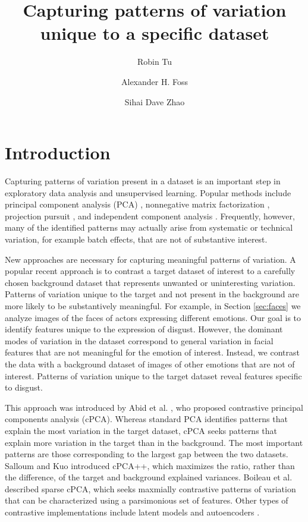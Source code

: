 \documentclass[12pt]{article}
\title{Capturing patterns of variation unique to a specific dataset}
\author[1]{Robin Tu}
\author[2]{ Alexander H. Foss }
\author[1]{Sihai Dave Zhao}
\affil[1]{Department of Statistics, University of Illinois at Urbana-Champaign, Champaign, IL}
\affil[2]{Statistical Sciences, Sandia National Laboratories, Albuquerque, NM}
\begin{document}
\maketitle

\section{Introduction}

Capturing patterns of variation present in a dataset is an important step in exploratory data analysis and unsupervised learning. Popular methods include principal component analysis (PCA) \cite{pca}, nonnegative matrix factorization \cite{Lee1999}, projection pursuit \cite{pp}, and independent component analysis \cite{ica}. Frequently, however, many of the identified patterns may actually arise from systematic or technical variation, for example batch effects, that are not of substantive interest.

New approaches are necessary for capturing meaningful patterns of variation. A popular recent approach is to contrast a target dataset of interest to a carefully chosen background dataset that represents unwanted or uninteresting variation. Patterns of variation unique to the target and not present in the background are more likely to be substantively meaningful. For example, in Section \ref{sec:faces} we analyze images of the faces of actors expressing different emotions. Our goal is to identify features unique to the expression of disgust. However, the dominant modes of variation in the dataset correspond to general variation in facial features that are not meaningful for the emotion of interest. Instead, we contrast the data with a background dataset of images of other emotions that are not of interest. Patterns of variation unique to the target dataset reveal features specific to disgust.

This approach was introduced by Abid et al. \cite{Abid}, who proposed contrastive principal components analysis (cPCA). Whereas standard PCA identifies patterns that explain the most variation in the target dataset, cPCA seeks patterns that explain more variation in the target than in the background. The most important patterns are those corresponding to the largest gap between the two datasets. Salloum and Kuo \cite{Salloum} introduced cPCA++, which maximizes the ratio, rather than the difference, of the target and background explained variances. Boileau et al. \cite{Boileau} described sparse cPCA, which seeks maxmially contrastive patterns of variation that can be characterized using a parsimonious set of features. Other types of contrastive implementations include latent models \cite{severson2019unsupervised} and autoencoders \cite{cautoencoder}.
\end{document}
